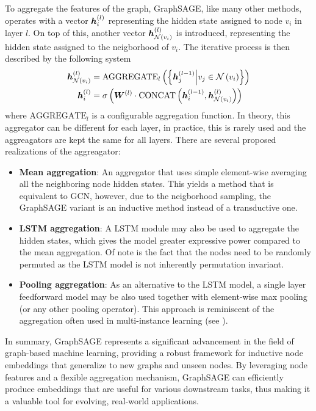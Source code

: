 To aggregate the features of the graph, GraphSAGE, like many other methods, operates with a vector \( \bm{h}_i^{(l)} \) representing the hidden state assigned to node \( v_i \) in layer \( l \). On top of this, another vector \( \bm{h}_{\mathcal{N} \left( v_i \right)}^{(l)} \) is introduced, representing the hidden state assigned to the neigborhood of \( v_i \). The iterative process is then described by the following system
\begin{equation}
	\begin{split}
		\bm{h}_{\mathcal{N} \left( v_i \right)}^{(l)} &= \mathrm{AGGREGATE}_l \left( \left\{ \bm{h}_j^{(l-1)} \middle| v_j \in \mathcal{N} \left( v_i \right) \right\} \right) \\
		\bm{h}_i^{(l)} &= \sigma \left( \bm{W}^{(l)} \cdot \mathrm{CONCAT} \left( \bm{h}_i^{(l-1)}, \bm{h}_{\mathcal{N} \left( v_i \right)}^{(l)} \right) \right) \\
	\end{split}
\end{equation}
where \( \mathrm{AGGREGATE}_l \) is a configurable aggregation function. In theory, this aggregator can be different for each layer, in practice, this is rarely used and the aggreagators are kept the same for all layers. There are several proposed realizations of the aggreagator:
\begin{itemize}
	\item \textbf{Mean aggregation}: An aggregator that uses simple element-wise averaging all the neighboring node hidden states. This yields a method that is equivalent to GCN, however, due to the neigborhood sampling, the GraphSAGE variant is an inductive method instead of a transductive one.
	\item \textbf{LSTM aggregation}: A LSTM module may also be used to aggregate the hidden states, which gives the model greater expressive power compared to the mean aggregation. Of note is the fact that the nodes need to be randomly permuted as the LSTM model is not inherently permutation invariant.
	\item \textbf{Pooling aggregation}: As an alternative to the LSTM model, a single layer feedforward model may be also used together with element-wise max pooling (or any other pooling operator). This approach is reminiscent of the aggregation often used in multi-instance learning (see \cite{dietterich_solving_1997}).
\end{itemize}

In summary, GraphSAGE represents a significant advancement in the field of graph-based machine learning, providing a robust framework for inductive node embeddings that generalize to new graphs and unseen nodes. By leveraging node features and a flexible aggregation mechanism, GraphSAGE can efficiently produce embeddings that are useful for various downstream tasks, thus making it a valuable tool for evolving, real-world applications.

